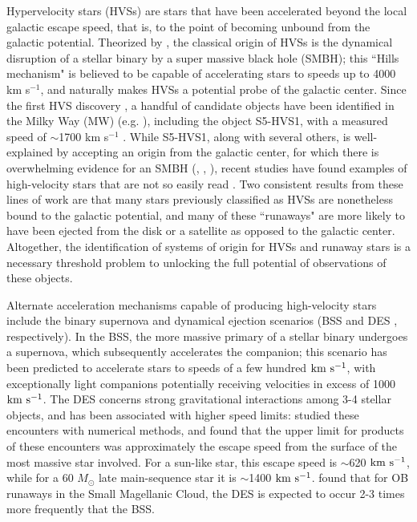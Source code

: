 \documentclass[twocolumn]{aastex631}
\newcommand{\kms}{${\rm km~s^{-1}}$}
\begin{document}
Hypervelocity stars (HVSs) are stars that have been accelerated beyond the local galactic escape speed, that is, to the point of becoming unbound from the galactic potential.
Theorized by \citealt{1988Natur.331..687H}, the classical origin of HVSs is the dynamical disruption of a stellar binary by a super massive black hole (SMBH); this ``Hills mechanism" is believed to be capable of accelerating stars to speeds up to 4000 km s$^{-1}$, and naturally makes HVSs a potential probe of the galactic center.
Since the first HVS discovery \citep{2005ApJ...622L..33B}, a handful of candidate objects have been identified in the Milky Way (MW) (e.g. \citealt{2014ApJ...787...89B}), including the object S5-HVS1, with a measured speed of $\sim$1700 km s$^{-1}$ \citep{2020MNRAS.491.2465K}.
While S5-HVS1, along with several others, is well-explained by accepting an origin from the galactic center, for which there is overwhelming evidence for an SMBH (\citealt{1998ApJ...509..678G}, \citealt{2018A&A...615L..15G}, \citealt{2022ApJ...930L..12E}), recent studies have found examples of high-velocity stars that are not so easily read \citep[e.g.][]{2018MNRAS.479.2789B, 2019MNRAS.483.2007E, 2021A&A...646L...4I}.
Two consistent results from these lines of work are that many stars previously classified as HVSs are nonetheless bound to the galactic potential, and many of these ``runaways" are more likely to have been ejected from the disk or a satellite as opposed to the galactic center.
Altogether, the identification of systems of origin for HVSs and runaway stars is a necessary threshold problem to unlocking the full potential of observations of these objects.

Alternate acceleration mechanisms capable of producing high-velocity stars include the binary supernova and dynamical ejection scenarios (BSS \citep{1961BAN....15..265B} and DES \citep{1967BOTT....4...86P}, respectively).
In the BSS, the more massive primary of a stellar binary undergoes a supernova, which subsequently accelerates the companion; this scenario has been predicted to accelerate stars to speeds of a few hundred \kms \citep{2019A&A...624A..66R, 2022MNRAS.tmp.3236I}, with exceptionally light companions potentially receiving velocities in excess of 1000 \kms \citep{2015MNRAS.448L...6T}.
The DES concerns strong gravitational interactions among 3-4 stellar objects, and has been associated with higher speed limits: \citet{1991AJ....101..562L} studied these encounters with numerical methods, and found that the upper limit for products of these encounters was approximately the escape speed from the surface of the most massive star involved.
For a sun-like star, this escape speed is $\sim$620 \kms, while for a 60 $M_\odot$ late main-sequence star it is $\sim$1400 \kms.
\citet{2020ApJ...903...43D} found that for OB runaways in the Small Magellanic Cloud, the DES is expected to occur 2-3 times more frequently that the BSS.
\end{document}
